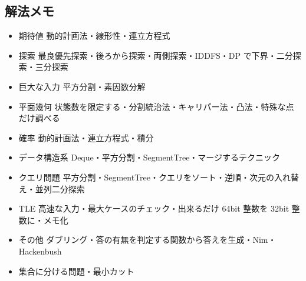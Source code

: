 \subsection{解法メモ}
\begin{itemize}
\setlength{\parskip}{0cm} %
\setlength{\itemsep}{0cm} %
\item 期待値 動的計画法・線形性・連立方程式
\item 探索 最良優先探索・後ろから探索・両側探索・IDDFS・DP で下界・二分探索・三分探索
\item 巨大な入力 平方分割・素因数分解
\item 平面幾何 状態数を限定する・分割統治法・キャリパー法・凸法・特殊な点だけ調べる
\item 確率 動的計画法・連立方程式・積分
\item データ構造系 Deque・平方分割・SegmentTree・マージするテクニック
\item クエリ問題 平方分割・SegmentTree・クエリをソート・逆順・次元の入れ替え・並列二分探索
\item TLE  高速な入力・最大ケースのチェック・出来るだけ 64bit 整数を 32bit 整数に・メモ化
\item その他 ダブリング・答の有無を判定する関数から答えを生成・Nim・Hackenbush
\item 集合に分ける問題・最小カット
\end{itemize}
